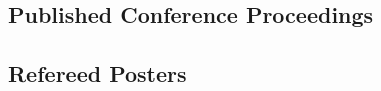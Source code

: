 \begin{refsection}
\section{Published Conference Proceedings}
\nocite{*}
\printbibliography[heading=none]
\end{refsection}

\vspace{-0.50cm}

\begin{refsection}
\section{Refereed Posters}
\nocite{*}
\printbibliography[heading=none]
\end{refsection}
